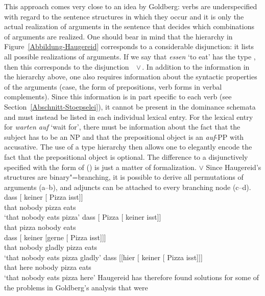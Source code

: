 \begin{exe}
\begin{xlist}[iv.]
\begin{exe}
\begin{xlist}[iv.]
This approach comes very close to an idea by Goldberg: verbs are underspecified with regard to the sentence structures in which they occur and
it is only the actual realization of arguments in the sentence that decides which combinations of arguments are realized.
One should bear in mind that the hierarchy in Figure~\ref{Abbildung-Haugereid} corresponds to a considerable disjunction:
it lists all possible realizations of arguments. If we say that \emph{essen} `to eat' has the type , then this
corresponds to the disjunction \,~$\vee$\,. In addition to the information in the hierarchy above, one also requires information about the syntactic properties of
the arguments (case, the form of prepositions, verb forms in verbal complements). Since this information is in part specific to each verb
(see Section~\ref{Abschnitt-Stoepselei}), it cannot be present in the dominance schemata and must instead be listed in each individual
lexical entry. For the lexical entry for \emph{warten auf} `wait for', there must be information about the fact that the subject has to be an
NP and that the prepositional object is an \emph{auf}-PP with accusative. The use of a type hierarchy then allows one to elegantly encode
the fact that the prepositional object is optional. The difference to a disjunctively specified
\compsl with the form of () is just a matter of formalization.
\ea
\comps {} $\vee$ 
\z
%
Since Haugereid's structures are binary"=branching, it is possible to derive all permutations of arguments (a--b), and adjuncts can be
attached to every branching node (c--d). 
\eal
\ex 
\gll dass [ keiner [ Pizza isst]]\\
     that {} nobody {} pizza eats\\
\glt `that nobody eats pizza'
\ex 
\gll dass [ Pizza [ keiner isst]]\\
	 that {} pizza {} nobody eats\\
\ex 
\gll dass [ keiner [gerne [ Pizza isst]]]\\
	 that {} nobody \spacebr{}gladly {} pizza eats\\
\glt `that nobody eats pizza gladly'
\ex 
\gll dass [[hier              [ keiner [ Pizza isst]]]\\
     that \hspaceThis{[[}here {}          nobody {} pizza eats\\
\glt `that nobody eats pizza here'
\zl
Haugereid has therefore found solutions for some of the problems in Goldberg's analysis that were

\end{xlist}
\end{exe}
\end{xlist}
\end{exe}
